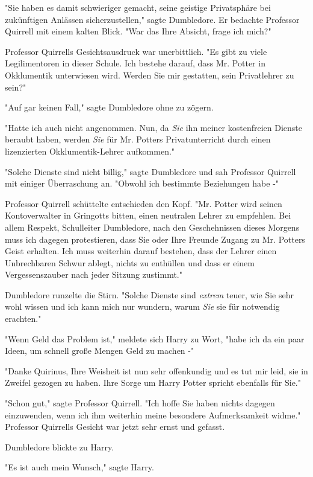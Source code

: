 {"Sie haben es damit schwieriger gemacht, seine geistige Privatsphäre bei zukünftigen Anlässen sicherzustellen," sagte Dumbledore. Er bedachte Professor Quirrell mit einem kalten Blick. "War das Ihre Absicht, frage ich mich?"

Professor Quirrells Gesichtsausdruck war unerbittlich. "Es gibt zu viele Legilimentoren in dieser Schule. Ich bestehe darauf, dass Mr. Potter in Okklumentik unterwiesen wird. Werden Sie mir gestatten, sein Privatlehrer zu sein?"

"Auf gar keinen Fall," sagte Dumbledore ohne zu zögern.

"Hatte ich auch nicht angenommen. Nun, da \emph{Sie} ihn meiner kostenfreien Dienste beraubt haben, werden \emph{Sie} für Mr. Potters Privatunterricht durch einen lizenzierten Okklumentik-Lehrer aufkommen."

"Solche Dienste sind nicht billig," sagte Dumbledore und sah Professor Quirrell mit einiger Überraschung an. "Obwohl ich bestimmte Beziehungen habe -"

Professor Quirrell schüttelte entschieden den Kopf. "Mr. Potter wird seinen Kontoverwalter in Gringotts bitten, einen neutralen Lehrer zu empfehlen. Bei allem Respekt, Schulleiter Dumbledore, nach den Geschehnissen dieses Morgens muss ich dagegen protestieren, dass Sie oder Ihre Freunde Zugang zu Mr. Potters Geist erhalten. Ich muss weiterhin darauf bestehen, dass der Lehrer einen Unbrechbaren Schwur ablegt, nichts zu enthüllen und dass er einem Vergessenszauber nach jeder Sitzung zustimmt."

Dumbledore runzelte die Stirn. "Solche Dienste sind \emph{extrem} teuer, wie Sie sehr wohl wissen und ich kann mich nur wundern, warum \emph{Sie} sie für notwendig erachten."

"Wenn Geld das Problem ist," meldete sich Harry zu Wort, "habe ich da ein paar Ideen, um schnell große Mengen Geld zu machen -"

"Danke Quirinus, Ihre Weisheit ist nun sehr offenkundig und es tut mir leid, sie in Zweifel gezogen zu haben. Ihre Sorge um Harry Potter spricht ebenfalls für Sie."

"Schon gut," sagte Professor Quirrell. "Ich hoffe Sie haben nichts dagegen einzuwenden, wenn ich ihm weiterhin meine besondere Aufmerksamkeit widme." Professor Quirrells Gesicht war jetzt sehr ernst und gefasst.

Dumbledore blickte zu Harry.

"Es ist auch mein Wunsch," sagte Harry.

}

